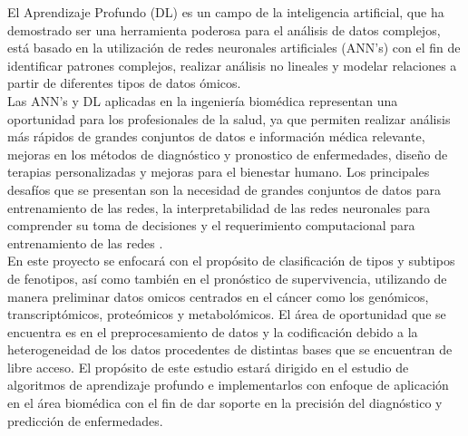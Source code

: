 El Aprendizaje Profundo (DL) es un campo de la inteligencia artificial, que ha demostrado ser una herramienta poderosa para el análisis de datos complejos, está basado en la utilización de redes neuronales artificiales (ANN’s) con el fin de identificar patrones complejos, realizar análisis no lineales y modelar relaciones a partir de diferentes tipos de datos ómicos. \\

Las ANN’s y DL aplicadas en la ingeniería biomédica representan una oportunidad para los profesionales de la salud, ya que permiten realizar análisis más rápidos de grandes conjuntos de datos e información médica relevante, mejoras en los métodos de diagnóstico y pronostico de enfermedades, diseño de terapias personalizadas y mejoras para el bienestar humano. Los principales desafíos que se presentan son la necesidad de grandes conjuntos de datos para entrenamiento de las redes, la interpretabilidad de las redes neuronales para comprender su toma de decisiones y el requerimiento computacional para entrenamiento de las redes \citep{sarmiento2020aplicaciones}.\\


En este proyecto se enfocará con el propósito de clasificación de tipos y subtipos de fenotipos, así como también en el pronóstico de supervivencia, utilizando de manera preliminar datos omicos centrados en el cáncer como los genómicos, transcriptómicos, proteómicos y metabolómicos. El área de oportunidad que se encuentra es en el preprocesamiento de datos y la codificación debido a la heterogeneidad de los datos procedentes de distintas bases que se encuentran de libre acceso. El propósito de este estudio estará dirigido en el estudio de algoritmos de aprendizaje profundo e implementarlos con enfoque de aplicación en el área biomédica con el fin de dar soporte en la precisión del diagnóstico y predicción de enfermedades.